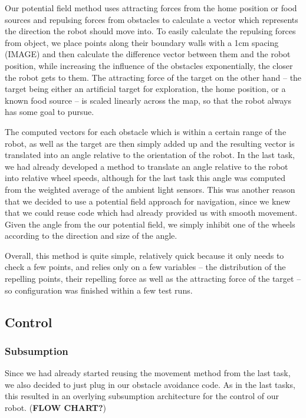 \documentclass[paper=a4, fontsize=12pt]{scrartcl}	%
\numberwithin{equation}{section}		%
\numberwithin{figure}{section}			%
\numberwithin{table}{section}				%
\begin{document}
Our potential field method uses attracting forces from the home position or food sources and repulsing forces from obstacles to calculate a vector which represents the direction the robot should move into. To easily calculate the repulsing forces from object, we place points along their boundary walls with a 1cm spacing (IMAGE) and then calculate the difference vector between them and the robot position, while increasing the influence of the obstacles exponentially, the closer the robot gets to them. The attracting force of the target on the other hand – the target being either an artificial target for exploration, the home position, or a known food source – is scaled linearly across the map, so that the robot always has some goal to pursue. 

The computed vectors for each obstacle which is within a certain range of the robot, as well as the target are then simply added up and the resulting vector is translated into an angle relative to the orientation of the robot. In the last task, we had already developed a method to translate an angle relative to the robot into relative wheel speeds, although for the last task this angle was computed from the weighted average of the ambient light sensors. This was another reason that we decided to use a potential field approach for navigation, since we knew that we could reuse code which had already provided us with smooth movement. Given the angle from the our potential field, we simply inhibit one of the wheels according to the direction and size of the angle.

Overall, this method is quite simple, relatively quick because it only needs to check a few points, and relies only on a few variables – the distribution of the repelling points, their repelling force as well as the attracting force of the target – so configuration was finished within a few test runs.

\subsection{Control}
\subsubsection{Subsumption}
Since we had already started reusing the movement method from the last task, we also decided to just plug in our obstacle avoidance code. As in the last tasks, this resulted in an overlying subsumption architecture for the control of our robot. (\textbf{FLOW CHART?})
\end{document}
